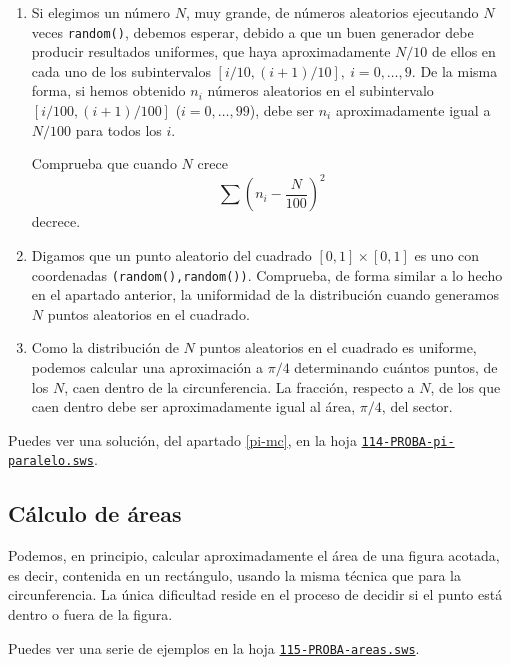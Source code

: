 \begin{ejer}
\begin{enumerate}
\item Si elegimos un n\'umero $N$, muy grande, de n\'umeros aleatorios
ejecutando $N$ veces  \lstinline|random()|, debemos esperar, debido a que un
buen generador debe producir resultados uniformes,  que haya aproximadamente
$N/10$  de ellos en cada uno de los subintervalos $[i/10,(i+1)/10],\
i=0,\dots,9.$ De la misma forma, si hemos obtenido $n_i$ n\'umeros aleatorios en
el subintervalo
$[i/100,(i+1)/100]$ ($i=0,\dots,99$), debe ser $n_i$ aproximadamente igual a
$N/100$ para todos los $i$. 

{\sc Comprueba} que cuando $N$ crece 
\[\sum(n_i-\frac{N}{100})^2\]
\noindent decrece.

\item Digamos que un punto aleatorio del cuadrado $[0,1]\times [0,1]$ es uno con
coordenadas 
\lstinline|(random(),random())|. {\sc Comprueba}, de forma similar a lo hecho en
el
apartado anterior,  la uniformidad de la distribuci\'on cuando generamos $N$
puntos aleatorios en el cuadrado.



\item \label{pi-mc}Como la distribuci\'on de $N$ puntos aleatorios en el
cuadrado es
uniforme, podemos  {\sc calcular} una aproximaci\'on a $\pi/4$ determinando
 cu\'antos puntos, de los $N$,   caen dentro
de la circunferencia. La fracci\'on, respecto a $N$,  de los que caen dentro
debe ser
aproximadamente igual al \'area, $\pi/4$,  del sector. 


\end{enumerate}
 
 \end{ejer}
 
Puedes ver una soluci\'on, del apartado \ref{pi-mc},  en la hoja 
\href{http://sage.mat.uam.es:8888/home/pub/??/}{\tt 114-PROBA-pi-paralelo.sws}.


\subsection{ C\'alculo de \'areas}

Podemos, en principio, calcular
aproximadamente  el \'area de una figura acotada, es decir, contenida en un
rect\'angulo, usando la misma t\'ecnica que para la circunferencia. La \'unica
dificultad reside en el proceso de decidir si el punto est\'a dentro o fuera de
la figura. 

Puedes ver una serie de ejemplos en la hoja 
\href{http://sage.mat.uam.es:8888/home/pub/??/}{\tt 115-PROBA-areas.sws}.

